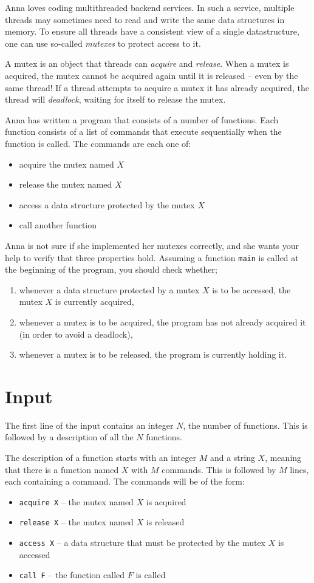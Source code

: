Anna loves coding multithreaded backend services.
In such a service, multiple threads may sometimes need to read and write the same data structures in memory.
To ensure all threads have a consistent view of a single datastructure, one can use so-called \emph{mutexes} to protect access to it.

A mutex is an object that threads can \emph{acquire} and \emph{release}.
When a mutex is acquired, the mutex cannot be acquired again until it is released -- even by the same thread!
If a thread attempts to acquire a mutex it has already acquired, the thread will \emph{deadlock}, waiting for itself to release the mutex.

Anna has written a program that consists of a number of functions.
Each function consists of a list of commands that execute sequentially when the function is called.
The commands are each one of:
\begin{itemize}
  \item acquire the mutex named $X$
  \item release the mutex named $X$
  \item access a data structure protected by the mutex $X$
  \item call another function
\end{itemize}

Anna is not sure if she implemented her mutexes correctly, and she wants your help to verify that three properties hold.
Assuming a function \texttt{main} is called at the beginning of the program, you should check whether;
\begin{enumerate}
  \item whenever a data structure protected by a mutex $X$ is to be accessed, the mutex $X$ is currently acquired,
  \item whenever a mutex is to be acquired, the program has not already acquired it (in order to avoid a deadlock),
  \item whenever a mutex is to be released, the program is currently holding it.
\end{enumerate}

\section*{Input}
The first line of the input contains an integer $N$, the number of functions.
This is followed by a description of all the $N$ functions.

The description of a function starts with an integer $M$ and a string $X$, meaning that there is a function named $X$ with $M$ commands.
This is followed by $M$ lines, each containing a command.
The commands will be of the form:
\begin{itemize}
  \item \texttt{acquire X} -- the mutex named $X$ is acquired
  \item \texttt{release X} -- the mutex named $X$ is released
  \item \texttt{access X} -- a data structure that must be protected by the mutex $X$ is accessed
  \item \texttt{call F} -- the function called $F$ is called
\end{itemize}

